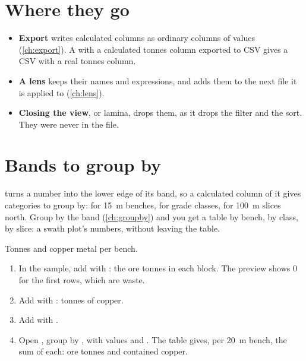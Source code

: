 \section{Where they go}\label{sec:calc-where}

\begin{itemize}
\item \textbf{Export} writes calculated columns as ordinary columns of values (\cref{ch:export}). A
 with a calculated tonnes column exported to CSV gives a CSV with a real tonnes column.
\item \textbf{A lens} keeps their names and expressions, and adds them to the next file it is applied to
(\cref{ch:lens}).
\item \textbf{Closing the view}, or lamina, drops them, as it drops the filter and the sort. They were
never in the file.
\end{itemize}

\section{Bands to group by}\label{sec:bands}

 turns a number into the lower edge of its band, so a calculated column of it gives categories
to group by:  for 15~m benches,  for grade classes,
 for 100~m slices north. Group by the band (\cref{ch:groupby}) and you get a table by
bench, by class, by slice: a swath plot's numbers, without leaving the table.

\begin{tryit}
Tonnes and copper metal per bench.
\begin{enumerate}
\item In the sample, add  with : the ore tonnes in each
block. The preview shows 0 for the first rows, which are waste.
\item Add  with : tonnes of copper.
\item Add  with .
\item Open , group by , with values  and . The table
gives, per 20~m bench, the sum of each: ore tonnes and contained copper.
\end{enumerate}
\end{tryit}
